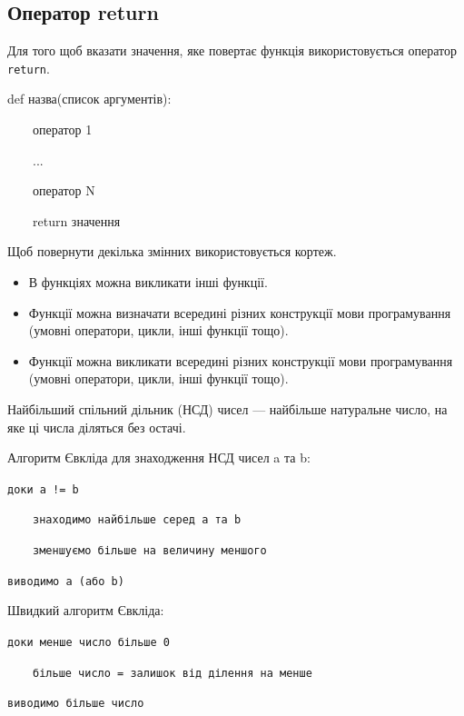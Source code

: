  \subsection{Оператор return} 
\begin{frame}
Для того щоб вказати значення, яке повертає функція використовується оператор \texttt{return}.

\LARGE{def назва(список аргументів):

~~~~оператор 1

~~~~... 

~~~~оператор N

~~~~return значення }

\normalsize Щоб повернути декілька змінних використовується кортеж.

\end{frame}

\begin{frame}
\begin{itemize}
  \item В функціях можна викликати інші функції.
  \item Функції можна визначати всередині різних конструкції мови програмування (умовні оператори, цикли, інші функції тощо).
  \item Функції можна викликати всередині різних конструкції мови програмування (умовні оператори, цикли, інші функції тощо).
\end{itemize}

\end{frame}

\begin{frame}
Найбільший спільний дільник (НСД) чисел — найбільше натуральне число, на яке ці числа діляться без остачі. 

Алгоритм Євкліда для знаходження НСД чисел a та b:

\texttt{доки а != b} 

~~~~\texttt{знаходимо найбільше серед а та b}


~~~~\texttt{зменшуємо більше на величину меншого}

\texttt{виводимо а (або b)}

Швидкий алгоритм Євкліда:

\texttt{доки менше число більше 0}

~~~~\texttt{більше число = залишок від ділення на менше} 

\texttt{виводимо більше число}
\end{frame}


